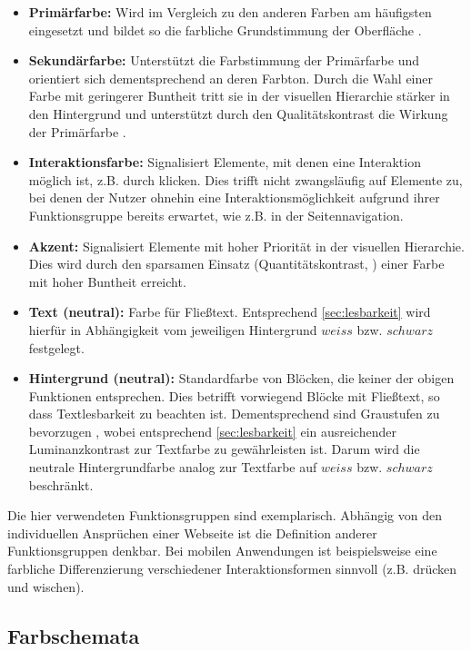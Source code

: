 \begin{itemize}
	\item \textbf{Primärfarbe:} Wird im Vergleich zu den anderen Farben am häufigsten eingesetzt und bildet so die farbliche Grundstimmung der Oberfläche \citep{awwwards}.
	\item \textbf{Sekundärfarbe:} Unterstützt die Farbstimmung der Primärfarbe und orientiert sich dementsprechend an deren Farbton. Durch die Wahl einer Farbe mit geringerer Buntheit tritt sie in der visuellen Hierarchie stärker in den Hintergrund \citep{visual-hierarchy} und unterstützt durch den Qualitätskontrast die Wirkung der Primärfarbe \citep{webdesign}.
	\item \textbf{Interaktionsfarbe:} Signalisiert Elemente, mit denen eine Interaktion möglich ist, z.B. durch klicken. Dies trifft nicht zwangsläufig auf Elemente zu, bei denen der Nutzer ohnehin eine Interaktionsmöglichkeit aufgrund ihrer Funktionsgruppe bereits erwartet, wie z.B. in der Seitennavigation.
	\item \textbf{Akzent:} Signalisiert Elemente mit hoher Priorität in der visuellen Hierarchie. Dies wird durch den sparsamen Einsatz (Quantitätskontrast, \citep{webdesign}) einer Farbe mit hoher Buntheit \citep{visual-hierarchy} erreicht.
	\item \textbf{Text (neutral):} Farbe für Fließtext. Entsprechend \autoref{sec:lesbarkeit} wird hierfür in Abhängigkeit vom jeweiligen Hintergrund $weiss$ bzw. $schwarz$ festgelegt.
	\item \textbf{Hintergrund (neutral):} Standardfarbe von Blöcken, die keiner der obigen Funktionen entsprechen. Dies betrifft vorwiegend Blöcke mit Fließtext, so dass Textlesbarkeit zu beachten ist. Dementsprechend sind Graustufen zu bevorzugen \citep{webx0}, wobei entsprechend \autoref{sec:lesbarkeit} ein ausreichender Luminanzkontrast zur Textfarbe zu gewährleisten ist. Darum wird die neutrale Hintergrundfarbe analog zur Textfarbe auf $weiss$ bzw. $schwarz$ beschränkt.
\end{itemize}

Die hier verwendeten Funktionsgruppen sind exemplarisch. Abhängig von den individuellen Ansprüchen einer Webseite ist die Definition anderer Funktionsgruppen denkbar. Bei mobilen Anwendungen ist beispielsweise eine farbliche Differenzierung verschiedener Interaktionsformen sinnvoll (z.B. drücken und wischen).

\subsection{Farbschemata}
\label{sec:farbschemata}

